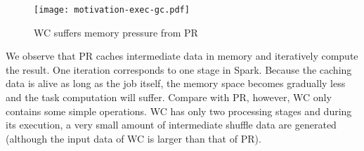 \begin{figure}[!t]
\centering
\texttt{[image: motivation-exec-gc.pdf]}
\vspace{-2mm}
\caption{WC suffers memory pressure from PR}
\vspace{-6mm}
\label{fig:memorypressure}
\end{figure}

\begin{comment}
\begin{figure}[!t]
\centering
\subfigure[Execution Time]{
\label{fig:subfig:mot-exec}
\texttt{[image: motivation-exec.pdf]}}
\hspace{-1.3ex}
\subfigure[GC Time]{
\label{fig:subfig:mot-gc}
\texttt{[image: motivation-gc.pdf]}}
\label{fig:wc-result}
\vspace{-2mm}
\caption{The Impact of Memory Pressure}
\vspace{-2mm}
\end{figure}
\end{comment}


We observe that PR caches intermediate data in memory and iteratively compute the result. One iteration corresponds to one stage in Spark. Because the caching data is alive as long as the job itself, the memory space becomes gradually less and the task computation will suffer. 
Compare with PR, however, WC only contains some simple operations. WC has only two processing stages and during its execution, a very small amount of intermediate shuffle data are generated (although the input data of WC is larger than that of PR). 


